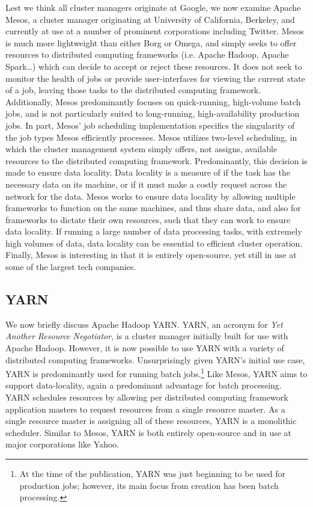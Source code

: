 \documentclass[twoside]{report}
\begin{document}
Lest we think all cluster managers originate at Google, we now examine Apache
Mesos, a cluster manager originating at University of California, Berkeley, and
currently at use at a number of prominent corporations including Twitter. Mesos
is much more lightweight than either Borg or Omega, and simply seeks to offer
resources to distributed computing frameworks (i.e. Apache Hadoop, Apache
Spark\dots) which can decide to accept or reject these resources. It does not
seek to monitor the health of jobs or provide user-interfaces for viewing the
current state of a job, leaving those tasks to the distributed computing
framework. Additionally, Mesos predominantly focuses on quick-running,
high-volume batch jobs, and is not particularly suited to long-running,
high-availability production jobs.\cite[pg. 358]{omega} In part, Mesos'
job scheduling implementation specifics the singularity of the job types
Mesos efficiently processes. Mesos utilizes two-level scheduling, in which the
cluster management system simply offers, not assigns, available
resources to the distributed computing framework. Predominantly, this decision
is made to ensure data locality.\cite[pg. 1]{mesos} Data locality is a measure
of if the task has the necessary data on its machine, or if it must make a
costly request across the network for the data. Mesos works to ensure data
locality by allowing multiple frameworks to function on the same machines, and
thus share data, and also for frameworks to dictate their own resources, such
that they can work to ensure data locality. If running a large number of data
processing tasks, with extremely high volumes of data, data locality can be
essential to efficient cluster operation. Finally, Mesos is interesting in
that it is entirely open-source, yet still in use at some of the largest tech
companies.

\subsection{YARN}

We now briefly discuss Apache Hadoop YARN. YARN, an acronym for \textit{Yet Another
Resource Negotiator}, is a cluster manager initially built for use with Apache
Hadoop.\cite[pg. 1]{yarn} However, it is now possible to use YARN with a variety
of distributed computing frameworks. Unsurprisingly given YARN's initial use
case, YARN is predominantly used for running batch jobs.\footnote{At the time of
the publication, YARN was just beginning to be used for production jobs;
however, its main focus from creation has been batch processing.\cite[pg.
11]{yarn}} Like Mesos, YARN aims to support data-locality,
again a predominant advantage for batch processing.\cite[pg. 3]{yarn} YARN
schedules resources by allowing per distributed computing framework application
masters to request resources from a single resource master.\cite[pg. 5]{yarn} As
a single resource master is assigning all of these resources, YARN is a
monolithic scheduler. Similar to Mesos, YARN is both entirely open-source and in use
at major corporations like Yahoo.\cite[pg. 9]{yarn}
\end{document}
